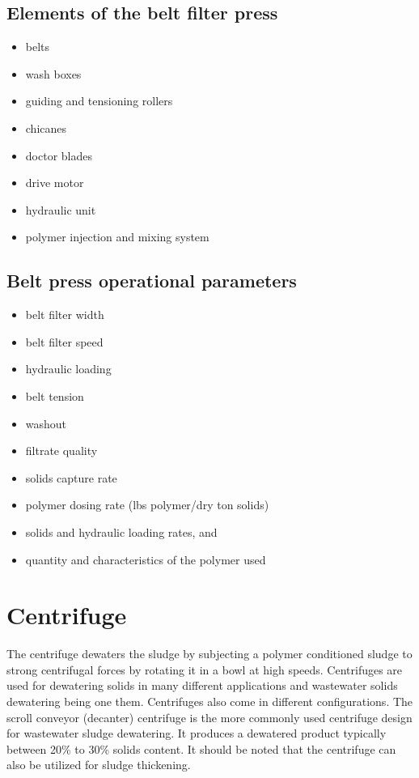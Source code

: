 \subsection{Elements of the belt filter press}


 
						\begin{itemize}
							\item belts
							\item wash boxes
							\item guiding and tensioning rollers
							\item chicanes 
							\item doctor blades
							\item drive motor
							\item hydraulic unit
							\item polymer injection and mixing system
						\end{itemize}

\subsection{Belt press operational parameters}


						\begin{itemize}
							\item belt filter width
							\item belt filter speed
							\item hydraulic loading
							\item belt tension
							\item washout
							\item filtrate quality
							\item solids capture rate
							\item polymer dosing rate (lbs polymer/dry ton solids)
							\item solids and hydraulic loading rates, and
							\item quantity and characteristics of the polymer used
						\end{itemize}

\section{Centrifuge}
			The centrifuge dewaters the sludge by subjecting a polymer conditioned sludge to strong centrifugal forces by rotating it in a bowl at high speeds.  Centrifuges are used for dewatering solids in many different applications and wastewater solids dewatering being one them.  Centrifuges also come in different configurations.  The scroll conveyor (decanter) centrifuge is the more commonly used centrifuge design for wastewater sludge dewatering.  It produces a dewatered product typically between 20\% to 30\% solids content.  It should be noted that the centrifuge can also be utilized for sludge thickening.

